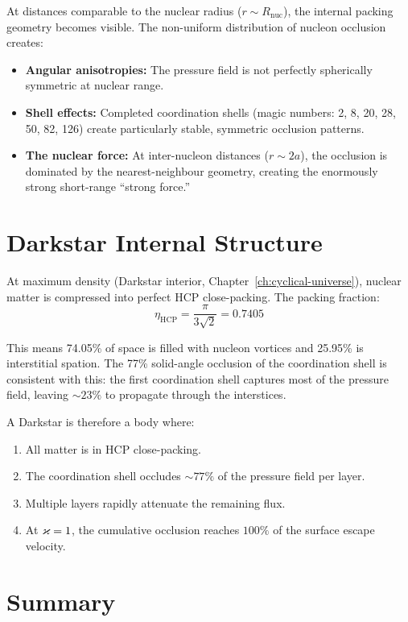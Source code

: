 At distances comparable to the nuclear radius ($r \sim R_{\text{nuc}}$), the internal packing geometry becomes visible. The non-uniform distribution of nucleon occlusion creates:
\begin{itemize}
  \item \textbf{Angular anisotropies:} The pressure field is not perfectly spherically symmetric at nuclear range.
  \item \textbf{Shell effects:} Completed coordination shells (magic numbers: 2, 8, 20, 28, 50, 82, 126) create particularly stable, symmetric occlusion patterns.
  \item \textbf{The nuclear force:} At inter-nucleon distances ($r \sim 2a$), the occlusion is dominated by the nearest-neighbour geometry, creating the enormously strong short-range ``strong force.''
\end{itemize}


\section{Darkstar Internal Structure}

At maximum density (Darkstar interior, Chapter~\ref{ch:cyclical-universe}), nuclear matter is compressed into perfect HCP close-packing. The packing fraction:
\begin{equation}
  \eta_{\text{HCP}} = \frac{\pi}{3\sqrt{2}} = 0.7405
\end{equation}

This means 74.05\% of space is filled with nucleon vortices and 25.95\% is interstitial spation. The 77\% solid-angle occlusion of the coordination shell is consistent with this: the first coordination shell captures most of the pressure field, leaving $\sim 23\%$ to propagate through the interstices.

A Darkstar is therefore a body where:
\begin{enumerate}
  \item All matter is in HCP close-packing.
  \item The coordination shell occludes $\sim 77\%$ of the pressure field per layer.
  \item Multiple layers rapidly attenuate the remaining flux.
  \item At $\varkappa = 1$, the cumulative occlusion reaches $100\%$ of the surface escape velocity.
\end{enumerate}


\section{Summary}

